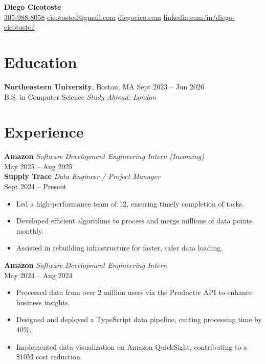 \documentclass[a4paper,10pt]{article}
\begin{document}
\begin{center}
    {\LARGE \textbf{Diego Cicotoste}}\\[0.5em]
    \small \href{tel:305-988-8058}{305-988-8058} \textbar{} 
    \href{mailto:cicotosted@gmail.com}{cicotosted@gmail.com} \textbar{} 
    \href{https://www.diegocico.com}{diegocico.com} \textbar{} 
    \href{https://www.linkedin.com/in/diego-cicotoste/}{linkedin.com/in/diego-cicotoste/}
\end{center}

\section*{Education}
\textbf{Northeastern University}, Boston, MA \hfill Sept 2023 -- Jun 2026\\
B.S. in Computer Science \hfill \textit{Study Abroad: London}

\section*{Experience}
\textbf{Amazon} \hfill \textit{Software Development Engineering Intern (Incoming)}\\
May 2025 -- Aug 2025\\[0.5em]

\textbf{Supply Trace} \hfill \textit{Data Engineer / Project Manager}\\
Sept 2024 -- Present
\begin{itemize}
    \item Led a high-performance team of 12, ensuring timely completion of tasks.
    \item Developed efficient algorithms to process and merge millions of data points monthly.
    \item Assisted in rebuilding infrastructure for faster, safer data loading.
\end{itemize}

\textbf{Amazon} \hfill \textit{Software Development Engineering Intern}\\
May 2024 -- Aug 2024
\begin{itemize}
    \item Processed data from over 2 million users via the Productiv API to enhance business insights.
    \item Designed and deployed a TypeScript data pipeline, cutting processing time by 40\%.
    \item Implemented data visualization on Amazon QuickSight, contributing to a \$10M cost reduction.
\end{itemize}
\end{document}
